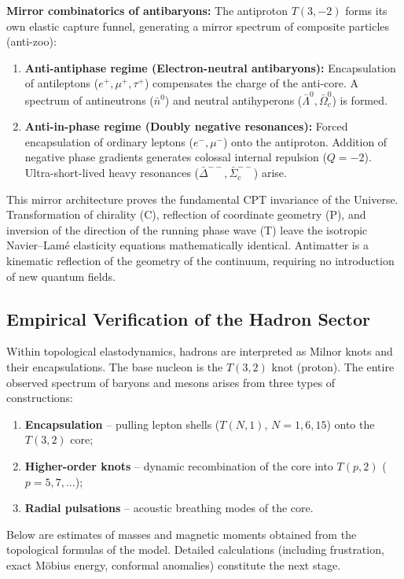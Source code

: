 \documentclass[11pt,a4paper]{article}
\begin{document}
\textbf{Mirror combinatorics of antibaryons:}
The antiproton $T(3,-2)$ forms its own elastic capture funnel, generating a mirror spectrum of composite particles (anti-zoo):
\begin{enumerate}
\item \textbf{Anti-antiphase regime (Electron-neutral antibaryons):} Encapsulation of antileptons ($e^+, \mu^+, \tau^+$) compensates the charge of the anti-core. A spectrum of antineutrons ($\bar{n}^0$) and neutral antihyperons ($\bar{\Lambda}^0, \bar{\Omega}_c^0$) is formed.
\item \textbf{Anti-in-phase regime (Doubly negative resonances):} Forced encapsulation of ordinary leptons ($e^-, \mu^-$) onto the antiproton. Addition of negative phase gradients generates colossal internal repulsion ($Q=-2$). Ultra-short-lived heavy resonances ($\bar{\Delta}^{--}, \bar{\Sigma}_c^{--}$) arise.
\end{enumerate}

This mirror architecture proves the fundamental CPT invariance of the Universe. Transformation of chirality (C), reflection of coordinate geometry (P), and inversion of the direction of the running phase wave (T) leave the isotropic Navier–Lamé elasticity equations mathematically identical. Antimatter is a kinematic reflection of the geometry of the continuum, requiring no introduction of new quantum fields.

\subsection{Empirical Verification of the Hadron Sector}
\label{sec:hadron_verification}

Within topological elastodynamics, hadrons are interpreted as Milnor knots and their encapsulations. The base nucleon is the $T(3,2)$ knot (proton). The entire observed spectrum of baryons and mesons arises from three types of constructions:
\begin{enumerate}
\item \textbf{Encapsulation} – pulling lepton shells ($T(N,1)$, $N=1,6,15$) onto the $T(3,2)$ core;
\item \textbf{Higher-order knots} – dynamic recombination of the core into $T(p,2)$ ($p=5,7,\dots$);
\item \textbf{Radial pulsations} – acoustic breathing modes of the core.
\end{enumerate}
Below are estimates of masses and magnetic moments obtained from the topological formulas of the model. Detailed calculations (including frustration, exact Möbius energy, conformal anomalies) constitute the next stage.
\end{document}
